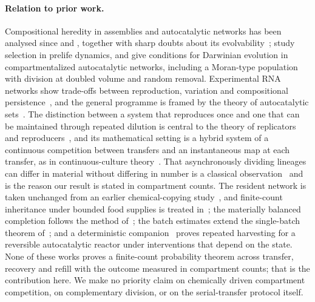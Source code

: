 \documentclass[11pt,a4paper]{article}
\theoremstyle{plain}
\theoremstyle{definition}
\theoremstyle{remark}
\begin{document}
\paragraph{Relation to prior work.}
Compositional heredity in assemblies and autocatalytic networks has been analysed since \citet{segre2000} and \citet{szathmary1987}, together with sharp doubts about its evolvability~\citep{vasas2010,vasas2012}; \citet{nowak2008} study selection in prelife dynamics, and \citet{matsubara2026} give conditions for Darwinian evolution in compartmentalized autocatalytic networks, including a Moran-type population~\citep{moran1958} with division at doubled volume and random removal. Experimental RNA networks show trade-offs between reproduction, variation and compositional persistence~\citep{ameta2021}, and the general programme is framed by the theory of autocatalytic sets~\citep{kauffman1986,hordijk2004,blokhuis2020,nghe2015}. The distinction between a system that reproduces once and one that can be maintained through repeated dilution is central to the theory of replicators and reproducers~\citep{eigen1971,szathmary2006}, and its mathematical setting is a hybrid system of a continuous competition between transfers and an instantaneous map at each transfer, as in continuous-culture theory~\citep{smithwaltman1995}. That asynchronously dividing lineages can differ in material without differing in number is a classical observation~\citep{powell1956,taheri2015} and is the reason our result is stated in compartment counts. The resident network is taken unchanged from an earlier chemical-copying study~\citep{copying2026}, and finite-count inheritance under bounded food supplies is treated in~\citep{inheritance2026}; the materially balanced completion follows the method of~\citep{thermo2026}; the batch estimates extend the single-batch theorem of~\citep{batch2026}; and a deterministic companion~\citep{recovery2026} proves repeated harvesting for a reversible autocatalytic reactor under interventions that depend on the state. None of these works proves a finite-count probability theorem across transfer, recovery and refill with the outcome measured in compartment counts; that is the contribution here. We make no priority claim on chemically driven compartment competition, on complementary division, or on the serial-transfer protocol itself.
\end{document}
